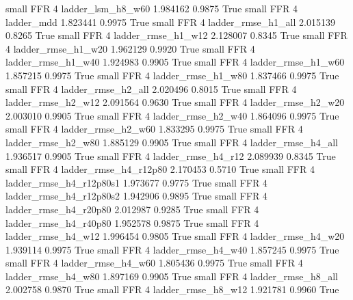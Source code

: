      small      FFR                 4        ladder_lsm_h8_w60   1.984162      0.9875    True
     small      FFR                 4               ladder_mdd   1.823441      0.9975    True
     small      FFR                 4       ladder_rmse_h1_all   2.015139      0.8265    True
     small      FFR                 4       ladder_rmse_h1_w12   2.128007      0.8345    True
     small      FFR                 4       ladder_rmse_h1_w20   1.962129      0.9920    True
     small      FFR                 4       ladder_rmse_h1_w40   1.924983      0.9905    True
     small      FFR                 4       ladder_rmse_h1_w60   1.857215      0.9975    True
     small      FFR                 4       ladder_rmse_h1_w80   1.837466      0.9975    True
     small      FFR                 4       ladder_rmse_h2_all   2.020496      0.8015    True
     small      FFR                 4       ladder_rmse_h2_w12   2.091564      0.9630    True
     small      FFR                 4       ladder_rmse_h2_w20   2.003010      0.9905    True
     small      FFR                 4       ladder_rmse_h2_w40   1.864096      0.9975    True
     small      FFR                 4       ladder_rmse_h2_w60   1.833295      0.9975    True
     small      FFR                 4       ladder_rmse_h2_w80   1.885129      0.9905    True
     small      FFR                 4       ladder_rmse_h4_all   1.936517      0.9905    True
     small      FFR                 4       ladder_rmse_h4_r12   2.089939      0.8345    True
     small      FFR                 4    ladder_rmse_h4_r12p80   2.170453      0.5710    True
     small      FFR                 4  ladder_rmse_h4_r12p80s1   1.973677      0.9775    True
     small      FFR                 4  ladder_rmse_h4_r12p80s2   1.942906      0.9895    True
     small      FFR                 4    ladder_rmse_h4_r20p80   2.012987      0.9285    True
     small      FFR                 4    ladder_rmse_h4_r40p80   1.952578      0.9875    True
     small      FFR                 4       ladder_rmse_h4_w12   1.996454      0.9805    True
     small      FFR                 4       ladder_rmse_h4_w20   1.939114      0.9975    True
     small      FFR                 4       ladder_rmse_h4_w40   1.857245      0.9975    True
     small      FFR                 4       ladder_rmse_h4_w60   1.805436      0.9975    True
     small      FFR                 4       ladder_rmse_h4_w80   1.897169      0.9905    True
     small      FFR                 4       ladder_rmse_h8_all   2.002758      0.9870    True
     small      FFR                 4       ladder_rmse_h8_w12   1.921781      0.9960    True
